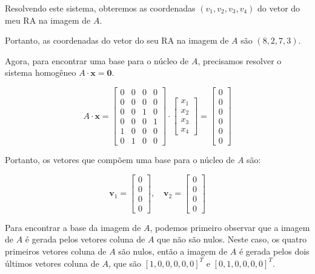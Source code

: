 Resolvendo este sistema, obteremos as coordenadas \( (v_1, v_2, v_3, v_4) \) do vetor do meu RA na imagem de \( A \).

Portanto, as coordenadas do vetor do seu RA na imagem de \( A \) são \( (8, 2, 7, 3) \).

Agora, para encontrar uma base para o núcleo de \( A \), precisamos resolver o sistema homogêneo \( A \cdot \mathbf{x} = \mathbf{0} \).

\[ A \cdot \mathbf{x} = \begin{bmatrix} 0 & 0 & 0 & 0 \\ 0 & 0 & 0 & 0 \\ 0 & 0 & 1 & 0 \\ 0 & 0 & 0 & 1 \\ 1 & 0 & 0 & 0 \\ 0 & 1 & 0 & 0 \end{bmatrix} \cdot \begin{bmatrix} x_1 \\ x_2 \\ x_3 \\ x_4 \end{bmatrix} = \begin{bmatrix} 0 \\ 0 \\ 0 \\ 0 \\ 0 \\ 0 \end{bmatrix} \]


Portanto, os vetores que compõem uma base para o núcleo de \( A \) são:

\[ \mathbf{v}_1 = \begin{bmatrix} 0 \\ 0 \\ 0 \\ 0 \end{bmatrix}, \quad \mathbf{v}_2 = \begin{bmatrix} 0 \\ 0 \\ 0 \\ 0 \end{bmatrix} \]


Para encontrar a base da imagem de \( A \), podemos primeiro observar que a imagem de \( A \) é gerada pelos vetores coluna de \( A \) que não são nulos. Neste caso, os quatro primeiros vetores coluna de \( A \) são nulos, então a imagem de \( A \) é gerada pelos dois últimos vetores coluna de \( A \), que são \( [1, 0, 0, 0, 0, 0]^T \) e \( [0, 1, 0, 0, 0, 0]^T \).

